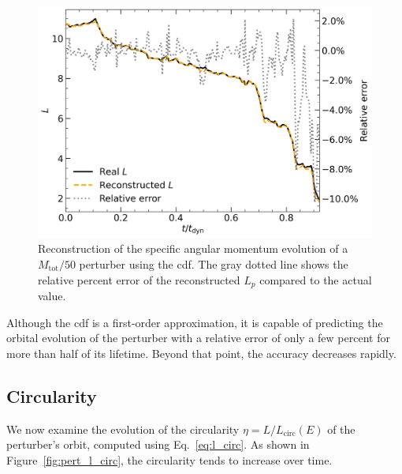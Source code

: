 \documentclass[twocolumn, a4paper]{article}
\begin{document}
\begin{figure}
    \centering
    \includegraphics[width=\columnwidth]{images/pert_l_cdf.png}
    \caption{Reconstruction of the specific angular momentum evolution of a \(M_\text{tot} / 50\) perturber using the \acrshort{cdf}. The gray dotted line shows the relative percent error of the reconstructed \(L_p\) compared to the actual value.}
    \label{fig:pert_l_cdf}
\end{figure}

Although the \acrshort{cdf} is a first-order approximation, it is capable of predicting the orbital evolution of the perturber with a relative error of only a few percent for more than half of its lifetime. Beyond that point, the accuracy decreases rapidly.

\subsection{Circularity}

We now examine the evolution of the circularity \(\eta = L / L_\text{circ}(E)\) of the perturber’s orbit, computed using Eq.~\ref{eq:l_circ}. As shown in Figure~\ref{fig:pert_l_circ}, the circularity tends to increase over time.
\end{document}
